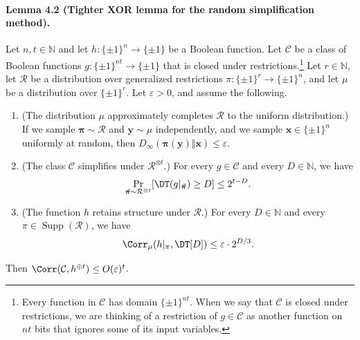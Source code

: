 \paragraph{Lemma 4.2 (Tighter XOR lemma for the random simplification method).}
Let $n,t\in\mathbb N$ and let $h:\{\pm1\}^n\to\{\pm1\}$ be a Boolean function. Let $\mathcal C$ be a class of Boolean functions $g:\{\pm1\}^{nt}\to\{\pm1\}$ that is closed under restrictions.\footnote{Every function in $\mathcal C$ has domain $\{\pm1\}^{nt}$. When we say that $\mathcal C$ is closed under restrictions, we are thinking of a restriction of $g\in\mathcal C$ as another function on $nt$ bits that ignores some of its input variables.} Let $r\in\mathbb N$, let $\mathcal R$ be a distribution over generalized restrictions $\pi:\{\pm1\}^r\to\{\pm1\}^n$, and let $\mu$ be a distribution over $\{\pm1\}^r$. Let $\varepsilon>0$, and assume the following.
\begin{enumerate}
\item (The distribution $\mu$ approximately completes $\mathcal R$ to the uniform distribution.) If we sample $\boldsymbol\pi\sim\mathcal R$ and $\mathbf y\sim\mu$ independently, and we sample $\mathbf x\in\{\pm1\}^n$ uniformly at random, then $D_\infty(\boldsymbol\pi(\mathbf y)\Vert\mathbf x)\le\varepsilon$.
\item (The class $\mathcal C$ simplifies under $\mathcal R^{\otimes t}$.) For every $g\in\mathcal C$ and every $D\in\mathbb N$, we have
\[\Pr_{\vec{\boldsymbol\pi}\sim\mathcal R^{\otimes t}}[\DT(g|_{\vec{\boldsymbol\pi}})\ge D]\le2^{t-D}.\]
\item (The function $h$ retains structure under $\mathcal R$.) For every $D\in\mathbb N$ and every $\pi\in\operatorname{Supp}(\mathcal R)$, we have
\[\Corr_\mu(h|_\pi,\DT[D])\le\varepsilon\cdot2^{D/3}.\]
\end{enumerate}
Then $\Corr(\mathcal C,h^{\oplus t})\le O(\varepsilon)^t$.
